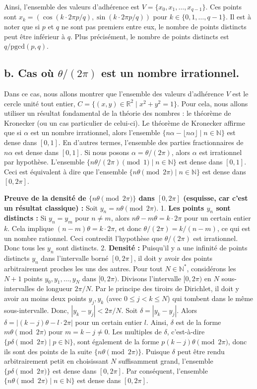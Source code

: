 \documentclass{report}
\begin{document}
Ainsi, l'ensemble des valeurs d'adhérence est $V = \{x_0, x_1, \dots, x_{q-1}\}$.
Ces points sont $x_k = (\cos(k \cdot 2\pi p/q), \sin(k \cdot 2\pi p/q))$ pour $k \in \{0, 1, \dots, q-1\}$.
Il est à noter que si $p$ et $q$ ne sont pas premiers entre eux, le nombre de points distincts peut être inférieur à $q$. Plus précisément, le nombre de points distincts est $q/\text{pgcd}(p,q)$.

\subsection*{b. Cas où $\theta / (2\pi)$ est un nombre irrationnel.}

Dans ce cas, nous allons montrer que l'ensemble des valeurs d'adhérence $V$ est le cercle unité tout entier, $C = \{(x,y) \in \mathbb{R}^2 \mid x^2+y^2=1\}$.
Pour cela, nous allons utiliser un résultat fondamental de la théorie des nombres : le théorème de Kronecker (ou un cas particulier de celui-ci).
Le théorème de Kronecker affirme que si $\alpha$ est un nombre irrationnel, alors l'ensemble $\{n\alpha - \lfloor n\alpha \rfloor \mid n \in \mathbb{N}\}$ est dense dans $[0, 1]$.
En d'autres termes, l'ensemble des parties fractionnaires de $n\alpha$ est dense dans $[0, 1]$.
Si nous posons $\alpha = \theta/(2\pi)$, alors $\alpha$ est irrationnel par hypothèse.
L'ensemble $\{n\theta/(2\pi) \pmod 1 \mid n \in \mathbb{N}\}$ est dense dans $[0, 1]$.
Ceci est équivalent à dire que l'ensemble $\{n\theta \pmod{2\pi} \mid n \in \mathbb{N}\}$ est dense dans $[0, 2\pi]$.

\textbf{Preuve de la densité de $\{n\theta \pmod{2\pi}\}$ dans $[0, 2\pi]$ (esquisse, car c'est un résultat classique) :}
Soit $y_n = n\theta \pmod{2\pi}$.
1.  \textbf{Les points $y_n$ sont distincts :} Si $y_n = y_m$ pour $n \ne m$, alors $n\theta - m\theta = k \cdot 2\pi$ pour un certain entier $k$. Cela implique $(n-m)\theta = k \cdot 2\pi$, et donc $\theta/(2\pi) = k/(n-m)$, ce qui est un nombre rationnel. Ceci contredit l'hypothèse que $\theta/(2\pi)$ est irrationnel. Donc tous les $y_n$ sont distincts.
2.  \textbf{Densité :} Puisqu'il y a une infinité de points distincts $y_n$ dans l'intervalle borné $[0, 2\pi]$, il doit y avoir des points arbitrairement proches les uns des autres.
    Pour tout $N \in \mathbb{N}^*$, considérons les $N+1$ points $y_0, y_1, \dots, y_N$ dans $[0, 2\pi)$. Divisons l'intervalle $[0, 2\pi)$ en $N$ sous-intervalles de longueur $2\pi/N$. Par le principe des tiroirs de Dirichlet, il doit y avoir au moins deux points $y_j, y_k$ (avec $0 \le j < k \le N$) qui tombent dans le même sous-intervalle.
    Donc, $|y_k - y_j| < 2\pi/N$. Soit $\delta = |y_k - y_j|$. Alors $\delta = |(k-j)\theta - l \cdot 2\pi|$ pour un certain entier $l$.
    Ainsi, $\delta$ est de la forme $m\theta \pmod{2\pi}$ pour $m=k-j \ne 0$.
    Les multiples de $\delta$, c'est-à-dire $\{p\delta \pmod{2\pi} \mid p \in \mathbb{N}\}$, sont également de la forme $p(k-j)\theta \pmod{2\pi}$, donc ils sont des points de la suite $\{n\theta \pmod{2\pi}\}$.
    Puisque $\delta$ peut être rendu arbitrairement petit en choisissant $N$ suffisamment grand, l'ensemble $\{p\delta \pmod{2\pi}\}$ est dense dans $[0, 2\pi]$.
    Par conséquent, l'ensemble $\{n\theta \pmod{2\pi} \mid n \in \mathbb{N}\}$ est dense dans $[0, 2\pi]$.
\end{document}
